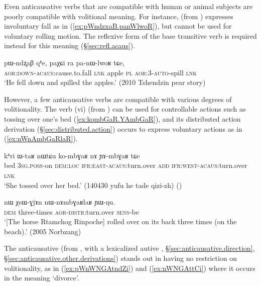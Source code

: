 Even anticausative verbs that are compatible with human or animal subjects are poorly compatible with volitional meaning. For instance,  (from ) expresses involuntary fall as in (\ref{ex:pWndzxaB.panWlwoR}), but cannot be used for voluntary rolling motion. The reflexive form of the base transitive verb  is required instead for this meaning (§\ref{sec:refl.acaus}).

\begin{exe}
\ex \label{ex:pWndzxaB.panWlwoR}
\gll pɯ-ndʐaβ qʰe, paχɕi ra pa-nɯ-lwoʁ tɕe, \\
\textsc{aor}:\textsc{down}-\textsc{acaus}:cause.to.fall \textsc{lnk} apple \textsc{pl} \textsc{aor}:3\flobv{}-\textsc{auto}-spill \textsc{lnk} \\
\glt `He fell down and spilled the apples.' (2010 Tshendzin pear story)
\end{exe} 

However, a few anticausative verbs are compatible with various degrees of volitionality. The verb  (vi) (from ) can be used for controllable actions such as tossing over one's bed (\ref{ex:kombGaR.YAmbGaR}), and its distributed action derivation (§\ref{sec:distributed.action})  occurs to express voluntary actions as in (\ref{ex:nWnAmbGaRlaR}).

\begin{exe}
\ex \label{ex:kombGaR.YAmbGaR}
\gll kʰri ɯ-taʁ nɯtɕu ko-mbɣaʁ nɤ ɲɤ-mbɣaʁ tɕe \\
bed \textsc{3sg}.\textsc{poss}-on \textsc{dem}:\textsc{loc} \textsc{ifr}:\textsc{east}-\textsc{acaus}:turn.over \textsc{add} \textsc{ifr}:\textsc{west}-\textsc{acaus}:turn.over \textsc{lnk} \\
\glt `She tossed over her bed.' (140430 yufu he tade qizi-zh) ()
\end{exe} 

 \begin{exe}
\ex \label{ex:nWnAmbGaRlaR}
\gll  nɯ χsɯ-ɣjɤn nɯ-nɤmbɣaʁlaʁ ɲɯ-ŋu. \\ 
\textsc{dem} three-times  \textsc{aor}-\textsc{distr}:turn.over  \textsc{sens}-be \\
\glt  `[The horse Rtamchog Rinpoche] rolled over on its back three times (on the beach).' (2005 Norbzang)
\end{exe}

The anticausative  (from , with a lexicalized autive , §\ref{sec:anticausative.direction}, §\ref{sec:anticausative.other.derivations}) stands out in having no restriction on volitionality, as in (\ref{ex:pWnWNGAtndZi}) and (\ref{ex:nWNGAttCi}) where it occurs in the meaning `divorce'. 

